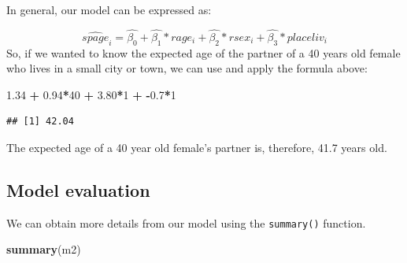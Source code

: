 \documentclass[
]{book}
\newenvironment{Shaded}{\begin{snugshade}}{\end{snugshade}}
\newcommand{\DecValTok}[1]{\textcolor[rgb]{0.00,0.00,0.81}{#1}}
\newcommand{\FloatTok}[1]{\textcolor[rgb]{0.00,0.00,0.81}{#1}}
\newcommand{\FunctionTok}[1]{\textcolor[rgb]{0.13,0.29,0.53}{\textbf{#1}}}
\newcommand{\NormalTok}[1]{#1}
\newcommand{\SpecialCharTok}[1]{\textcolor[rgb]{0.81,0.36,0.00}{\textbf{#1}}}
\begin{document}
In general, our model can be expressed as:

\[ \hat{spage}_i = \hat{\beta_0} + \hat{\beta_1}*rage_i + \hat{\beta_2}*rsex_i + \hat{\beta_3} *  placeliv_i \]
So, if we wanted to know the expected age of the partner of a 40 years old female who lives in a small city or town, we can use and apply the formula above:

\begin{Shaded}
\begin{Highlighting}[]
\FloatTok{1.34} \SpecialCharTok{+} \FloatTok{0.94}\SpecialCharTok{*}\DecValTok{40} \SpecialCharTok{+} \FloatTok{3.80}\SpecialCharTok{*}\DecValTok{1} \SpecialCharTok{+} \SpecialCharTok{{-}}\FloatTok{0.7}\SpecialCharTok{*}\DecValTok{1}
\end{Highlighting}
\end{Shaded}

\begin{verbatim}
## [1] 42.04
\end{verbatim}

The expected age of a 40 year old female's partner is, therefore, 41.7 years old.

\hypertarget{model-evaluation-1}{%
\subsection{Model evaluation}\label{model-evaluation-1}}

We can obtain more details from our model using the \texttt{summary()} function.

\begin{Shaded}
\begin{Highlighting}[]
\FunctionTok{summary}\NormalTok{(m2)}
\end{Highlighting}
\end{Shaded}
\end{document}
